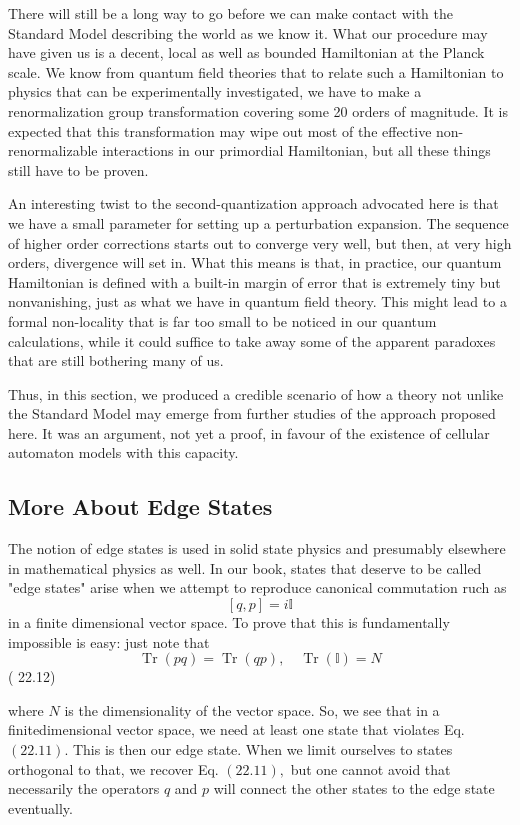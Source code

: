 \documentclass[main.tex]{subfiles}
\begin{document}
There will still be a long way to go before we can make contact with the Standard Model describing the world as we know it. What our procedure may have given us is a decent, local as well as bounded Hamiltonian at the Planck scale. We know from quantum field theories that to relate such a Hamiltonian to physics that can be experimentally investigated, we have to make a renormalization group transformation covering some 20 orders of magnitude. It is expected that this transformation may wipe out most of the effective non-renormalizable interactions in our primordial Hamiltonian, but all these things still have to be proven.

An interesting twist to the second-quantization approach advocated here is that we have a small parameter for setting up a perturbation expansion. The sequence of higher order corrections starts out to converge very well, but then, at very high orders, divergence will set in. What this means is that, in practice, our quantum Hamiltonian is defined with a built-in margin of error that is extremely tiny but nonvanishing, just as what we have in quantum field theory. This might lead to a formal non-locality that is far too small to be noticed in our quantum calculations, while it could suffice to take away some of the apparent paradoxes that are still bothering many of us.

Thus, in this section, we produced a credible scenario of how a theory not unlike the Standard Model may emerge from further studies of the approach proposed here. It was an argument, not yet a proof, in favour of the existence of cellular automaton models with this capacity.



\subsection{More About Edge States}\label{ch22.2}

The notion of edge states is used in solid state physics and presumably elsewhere in mathematical physics as well. In our book, states that deserve to be called "edge states" arise when we attempt to reproduce canonical commutation ruch as
$$
[q, p]=i \mathbb{I}
$$
in a finite dimensional vector space. To prove that this is fundamentally impossible is easy: just note that
$$
\operatorname{Tr}(p q)=\operatorname{Tr}(q p), \quad \operatorname{Tr}(\mathbb{I})=N
$$
( 22.12)

where $N$ is the dimensionality of the vector space. So, we see that in a finitedimensional vector space, we need at least one state that violates Eq. $(22.11) .$ This is then our edge state. When we limit ourselves to states orthogonal to that, we recover Eq. $(22.11),$ but one cannot avoid that necessarily the operators $q$ and $p$ will connect the other states to the edge state eventually.
\end{document}
